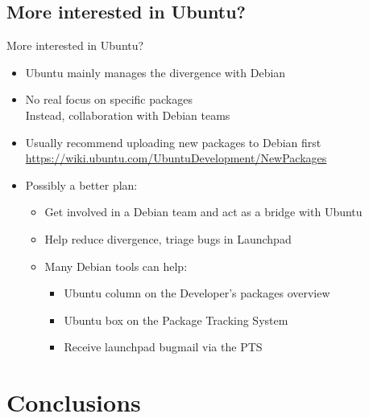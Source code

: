 \documentclass[10pt,final]{beamer}
\begin{document}
\subsection{More interested in Ubuntu?}
\begin{frame}{More interested in Ubuntu?}
  \begin{itemize}
  \item Ubuntu mainly manages the divergence with Debian
    \br
  \item No real focus on specific packages\\
    Instead, collaboration with Debian teams
    \br
  \item Usually recommend uploading new packages to Debian first\\
    \url{https://wiki.ubuntu.com/UbuntuDevelopment/NewPackages}
    \br
  \item Possibly a better plan:
    \begin{itemize}
    \item Get involved in a Debian team and act as a bridge with Ubuntu
      \hbr
    \item Help reduce divergence, triage bugs in Launchpad
      \hbr
    \item Many Debian tools can help:
      \begin{itemize}
      \item Ubuntu column on the Developer's packages overview
      \item Ubuntu box on the Package Tracking System
      \item Receive launchpad bugmail via the PTS
      \end{itemize}
    \end{itemize}
  \end{itemize}
\end{frame}

\section{Conclusions}
\end{document}
